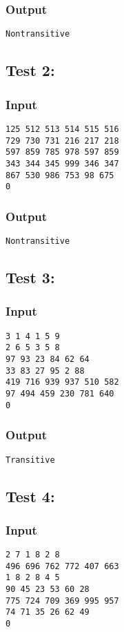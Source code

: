 \documentclass[twocolumn,9pt]{extarticle}
\begin{document}
\subsubsection*{Output}
\texttt{Nontransitive}
 
\subsection*{Test 2:}
\subsubsection*{Input}
\texttt{125 512 513 514 515 516\\
729 730 731 216 217 218\\
597 859 785 978 597 859\\
343 344 345 999 346 347\\
867 530 986 753 98 675\\
0}
 
\subsubsection*{Output}
\texttt{Nontransitive}
 
\subsection*{Test 3:}
\subsubsection*{Input}
\texttt{3 1 4 1 5 9\\
2 6 5 3 5 8\\
97 93 23 84 62 64\\
33 83 27 95 2 88\\
419 716 939 937 510 582\\
97 494 459 230 781 640\\
0}
 
\subsubsection*{Output}
\texttt{Transitive}
 
\subsection*{Test 4:}
\subsubsection*{Input}
\texttt{2 7 1 8 2 8\\
496 696 762 772 407 663\\
1 8 2 8 4 5\\
90 45 23 53 60 28\\
775 724 709 369 995 957\\
74 71 35 26 62 49\\
0}
 
\end{document}
